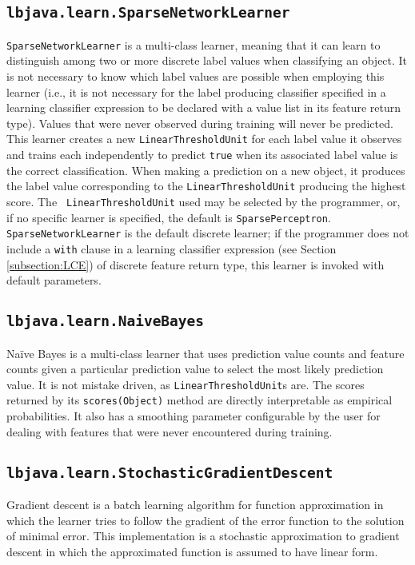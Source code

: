 \subsection{{\tt lbjava.learn.SparseNetworkLearner}} \label{subsection:SNL}
{\tt SparseNetworkLearner} is a multi-class learner, meaning that it can learn
to distinguish among two or more discrete label values when classifying an
object.  It is not necessary to know which label values are possible when
employing this learner (i.e., it is not necessary for the label producing
classifier specified in a learning classifier expression to be declared with a
value list in its feature return type).  Values that were never observed
during training will never be predicted. \\

This learner creates a new {\tt LinearThresholdUnit} for each label value it
observes and trains each independently to predict {\tt true} when its
associated label value is the correct classification.  When making a
prediction on a new object, it produces the label value corresponding to the
{\tt LinearThresholdUnit} producing the highest score.  The {\tt
LinearThresholdUnit} used may be selected by the programmer, or, if no
specific learner is specified, the default is {\tt SparsePerceptron}. \\

{\tt SparseNetworkLearner} is the default discrete learner; if the programmer
does not include a {\tt with} clause in a learning classifier expression (see
Section \ref{subsection:LCE}) of discrete feature return type, this learner is
invoked with default parameters.

\subsection{{\tt lbjava.learn.NaiveBayes}}
Na\"ive Bayes is a multi-class learner that uses prediction value counts and
feature counts given a particular prediction value to select the most likely
prediction value.  It is not mistake driven, as {\tt LinearThresholdUnit}s
are.  The scores returned by its {\tt scores(Object)} method are directly
interpretable as empirical probabilities.  It also has a smoothing parameter
configurable by the user for dealing with features that were never encountered
during training.

\subsection{{\tt lbjava.learn.StochasticGradientDescent}}
Gradient descent is a batch learning algorithm for function approximation in
which the learner tries to follow the gradient of the error function to the
solution of minimal error.  This implementation is a stochastic approximation
to gradient descent in which the approximated function is assumed to have
linear form. \\

